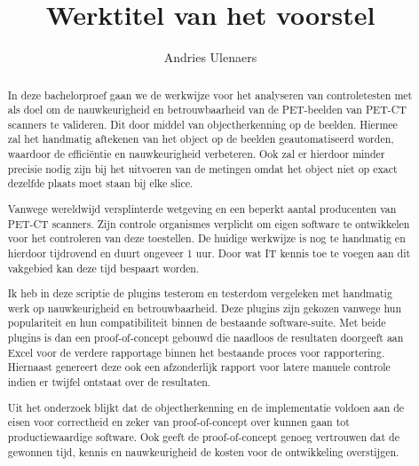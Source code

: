 \documentclass{hogent-article}
\title{Werktitel van het voorstel}
\author{Andries Ulenaers}
\begin{document}
\begin{abstract}
  In deze bachelorproef gaan we de werkwijze voor het analyseren van controletesten met als doel om de nauwkeurigheid en betrouwbaarheid van de PET-beelden van PET-CT scanners te valideren. Dit door middel van objectherkenning op de beelden. Hiermee zal het handmatig aftekenen van het object op de beelden geautomatiseerd worden, waardoor de efficiëntie en nauwkeurigheid verbeteren. Ook zal er hierdoor minder precisie nodig zijn bij het uitvoeren van de metingen omdat het object niet op exact dezelfde plaats moet staan bij elke slice.


  Vanwege wereldwijd versplinterde wetgeving en een beperkt aantal producenten van PET-CT scanners. Zijn controle organismes verplicht om eigen software te ontwikkelen voor het controleren van deze toestellen. De huidige werkwijze is nog te handmatig en hierdoor tijdrovend en duurt ongeveer 1 uur. Door wat IT kennis toe te voegen aan dit vakgebied kan deze tijd bespaart worden.

  Ik heb in deze scriptie de plugins testerom en testerdom vergeleken met handmatig werk op nauwkeurigheid en betrouwbaarheid. Deze plugins zijn gekozen vanwege hun populariteit en hun compatibiliteit binnen de bestaande software-suite. Met beide plugins is dan een proof-of-concept gebouwd die naadloos de resultaten doorgeeft aan Excel voor de verdere rapportage binnen het bestaande proces voor rapportering. Hiernaast genereert deze ook een afzonderlijk rapport voor latere manuele controle indien er twijfel ontstaat over de resultaten.
  
  Uit het onderzoek blijkt dat de objectherkenning en de implementatie voldoen aan de eisen voor correctheid en zeker van proof-of-concept over kunnen gaan tot productiewaardige software. Ook geeft de proof-of-concept genoeg vertrouwen dat de gewonnen tijd, kennis en nauwkeurigheid de kosten voor de ontwikkeling overstijgen.
  
\end{abstract}

\tableofcontents

\bigskip



\end{document}
